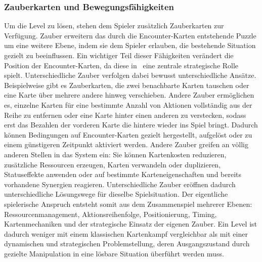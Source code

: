 \subsubsection{Zauberkarten und Bewegungsfähigkeiten}
Um die Level zu lösen, stehen dem Spieler zusätzlich Zauberkarten zur Verfügung.
Zauber erweitern das durch die Encounter-Karten entstehende Puzzle um eine weitere Ebene, indem sie dem Spieler erlauben, die bestehende Situation gezielt zu beeinflussen.
Ein wichtiger Teil dieser Fähigkeiten verändert die Position der Encounter-Karten, da diese in \coc\ eine zentrale strategische Rolle spielt.
Unterschiedliche Zauber verfolgen dabei bewusst unterschiedliche Ansätze.
Beispielweise gibt es Zauberkarten, die zwei benachbarte Karten tauschen oder eine Karte über mehrere andere hinweg verschieben.
Andere Zauber ermöglichen es, einzelne Karten für eine bestimmte Anzahl von Aktionen vollständig aus der Reihe zu entfernen oder eine Karte hinter einen anderen zu \glqq verstecken\grqq, sodass erst das Bezahlen der vorderen Karte die hintere wieder ins Spiel bringt.
Dadurch können Bedingungen auf Encounter-Karten gezielt hergestellt, aufgelöst oder zu einem günstigeren Zeitpunkt aktiviert werden.
Andere Zauber greifen an völlig anderen Stellen in das System ein: Sie können Kartenkosten reduzieren, zusätzliche Ressourcen erzeugen, Karten verwandeln oder duplizieren, Statuseffekte anwenden oder auf bestimmte Karteneigenschaften und bereits vorhandene Synergien reagieren.
Unterschiedliche Zauber eröffnen dadurch unterschiedliche Lösungswege für dieselbe Spielsituation.
Der eigentliche spielerische Anspruch entsteht somit aus dem Zusammenspiel mehrerer Ebenen: Ressourcenmanagement, Aktionsreihenfolge, Positionierung, Timing, Kartenmechaniken und der strategische Einsatz der eigenen Zauber.
Ein Level ist dadurch weniger mit einem klassischen Kartenkampf vergleichbar als mit einer dynamischen und strategischen Problemstellung, deren Ausgangszustand durch gezielte Manipulation in eine lösbare Situation überführt werden muss.

